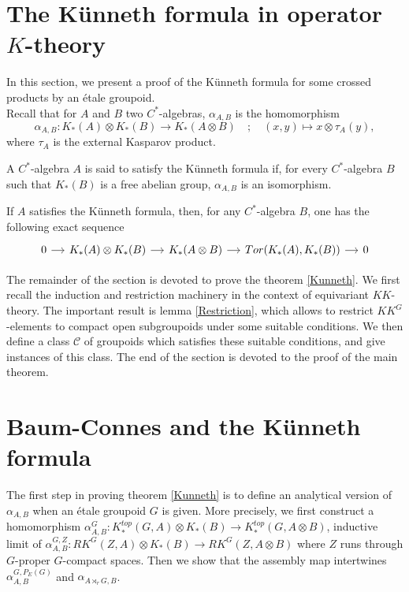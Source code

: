\section{The Künneth formula in operator $K$-theory}

In this section, we present a proof of the Künneth formula for some crossed products by an étale groupoid. \\ 

Recall that for $A$ and $B$ two $C^*$-algebras, $\alpha_{A,B}$ is the homomorphism
\[\alpha_{A,B} : K_*(A)\otimes K_*(B)\rightarrow K_*(A\otimes B) \quad ; \quad (x,y)\mapsto x\otimes   \tau_A(y),\]
where $\tau_A$ is the external Kasparov product.\\

\begin{definition}
A $C^*$-algebra $A$ is said to satisfy the Künneth formula if, for every $C^*$-algebra $B$ such that $K_*(B)$ is a free abelian group, $\alpha_{A,B}$ is an isomorphism.
\end{definition}

If $A$ satisfies the Künneth formula, then, for any $C^*$-algebra $B$, one has the following exact sequence
\[\begin{tikzcd}[column sep = small] 0 \arrow{r} & K_*(A)\otimes K_*(B)\arrow{r} & K_*(A\otimes B) \arrow{r} & Tor(K_*(A),K_*(B))\arrow{r} & 0 \end{tikzcd}\]

The remainder of the section is devoted to prove the theorem \ref{Kunneth}. We first recall the induction and restriction machinery in the context of equivariant $KK$-theory. The important result is lemma \ref{Restriction}, which allows to restrict $KK^G$-elements to compact open subgroupoids under some suitable conditions. We then define a class $\mathcal C$ of groupoids which satisfies these suitable conditions, and give instances of this class. The end of the section is devoted to the proof of the main theorem.



\section{Baum-Connes and the Künneth formula}
The first step in proving theorem \ref{Kunneth} is to define an analytical version of $\alpha_{A,B}$ when an étale groupoid $G$ is given. More precisely, we first construct a homomorphism $\alpha_{A,B}^G : K_*^{top}(G,A)\otimes K_*(B)\rightarrow K_*^{top}(G,A\otimes B )$, inductive limit of $\alpha_{A,B}^{G,Z} : RK^G(Z,A)\otimes K_*(B)\rightarrow RK^G(Z,A\otimes B )$ where $Z$ runs through $G$-proper $G$-compact spaces. Then we show that the assembly map intertwines $\alpha^{G,P_E(G)}_{A,B}$ and $\alpha_{A\rtimes_r G,B}$.\\


